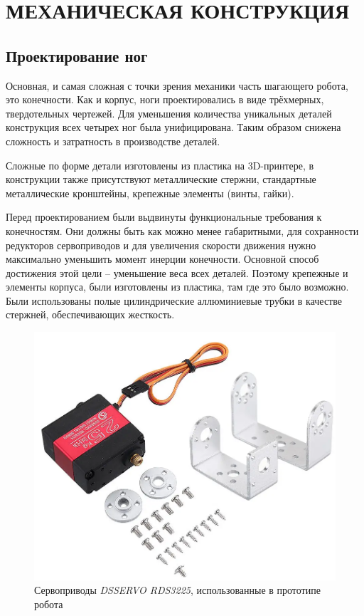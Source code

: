 \chapter{\MakeUppercase{Механическая конструкция}}
\section{Проектирование ног} \label{sec:leg_design}
Основная, и самая сложная с точки зрения механики часть шагающего робота, это конечности. Как и корпус, ноги проектировались в виде трёхмерных, твердотельных чертежей. Для уменьшения количества уникальных деталей конструкция всех четырех ног была унифицирована. Таким образом снижена сложность и затратность в производстве деталей. 

Сложные по форме детали изготовлены из пластика на 3D-принтере, в конструкции также присутствуют металлические стержни, стандартные металлические кронштейны, крепежные элементы (винты, гайки).

Перед проектированием были выдвинуты функциональные требования к конечностям. Они должны быть как можно менее габаритными, для сохранности редукторов сервоприводов и для увеличения скорости движения нужно максимально уменьшить момент инерции конечности. Основной способ достижения этой цели -- уменьшение веса всех деталей. Поэтому крепежные и элементы корпуса, были изготовлены из пластика, там где это было возможно. Были использованы полые цилиндрические аллюминиевые трубки в качестве стержней, обеспечивающих жесткость.

\begin{figure}[h]
    \centering
    \includegraphics[scale=0.45]{chapter_mechanics_construction/figure6.png}
    \caption{Сервоприводы \textit{DSSERVO RDS3225}, использованные в прототипе робота}
    \label{}
\end{figure}

